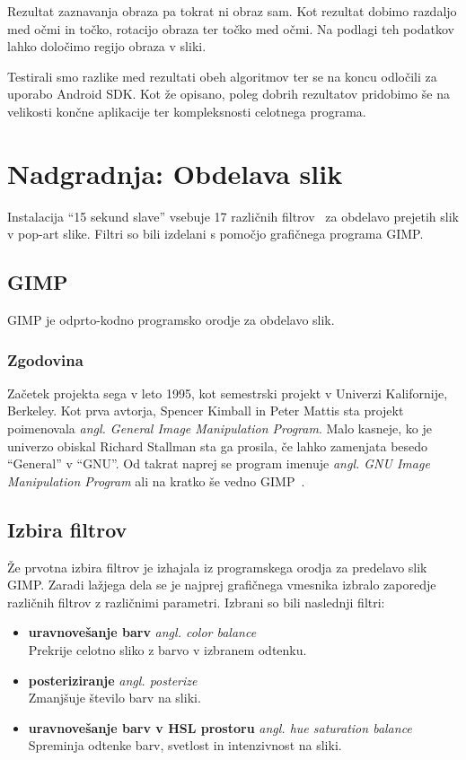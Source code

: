 Rezultat zaznavanja obraza pa tokrat ni obraz sam. Kot rezultat dobimo
razdaljo med očmi in točko, rotacijo obraza ter točko med očmi. Na podlagi teh
podatkov lahko določimo regijo obraza v sliki.

Testirali smo razlike med rezultati obeh algoritmov ter se na koncu odločili
za uporabo Android SDK. Kot že opisano, poleg dobrih rezultatov pridobimo še
na velikosti končne aplikacije ter kompleksnosti celotnega programa.


\chapter{Nadgradnja: Obdelava slik}
\label{ch:obdelavaSlik}
Instalacija ``15 sekund slave'' vsebuje 17 različnih
filtrov~\cite[Poglavje~5]{thesisSamoJuvan} za obdelavo prejetih slik v
pop-art slike. Filtri so bili izdelani s pomočjo grafičnega programa GIMP.


\section{GIMP}
GIMP je odprto-kodno programsko orodje za obdelavo slik.


\subsection{Zgodovina}
Začetek projekta sega v leto 1995, kot semestrski projekt v Univerzi
Kalifornije, Berkeley. Kot prva avtorja, Spencer Kimball in Peter Mattis sta
projekt poimenovala \textit{angl. General Image Manipulation Program}. Malo
kasneje, ko je univerzo obiskal Richard Stallman sta ga prosila, če lahko
zamenjata besedo ``General'' v ``GNU''. Od takrat naprej se program imenuje
\textit{angl. GNU Image Manipulation Program} ali na kratko še vedno
GIMP~\cite{wiki:GIMP}.


\section{Izbira filtrov}
Že prvotna izbira filtrov je izhajala iz programskega orodja za predelavo slik
GIMP. Zaradi lažjega dela se je najprej grafičnega vmesnika izbralo zaporedje
različnih filtrov z različnimi parametri. Izbrani so bili naslednji filtri:
\begin{itemize}
    \item \textbf{uravnovešanje barv} \textit{angl. color balance} \hfill \\
        Prekrije celotno sliko z barvo v izbranem odtenku.
    \item \textbf{posteriziranje} \textit{angl. posterize} \hfill \\
        Zmanjšuje število barv na sliki.
    \item \textbf{uravnovešanje barv v HSL prostoru} \textit{angl. hue saturation balance} \hfill \\
        Spreminja odtenke barv, svetlost in intenzivnost na sliki.
\end{itemize}


